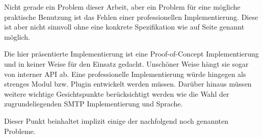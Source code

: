 Nicht gerade ein Problem dieser Arbeit, aber ein Problem für eine mögliche praktische Benutzung ist das Fehlen einer professionellen Implementierung. Diese ist aber nicht sinnvoll ohne eine konkrete Spezifikation wie auf Seite \pageref{section:spezifikation} genannt möglich.

Die hier präsentierte Implementierung ist eine Proof-of-Concept Implementierung und in keiner Weise für den Einsatz gedacht. Unschöner Weise hängt sie sogar von interner API ab.
Eine professionelle Implementierung würde hingegen als strenges Modul bzw. Plugin entwickelt werden müssen. Darüber hinaus müssen weitere wichtige Gesichtspunkte berücksichtigt werden wie die Wahl der zugrundeliegenden SMTP Implementierung und Sprache.

Dieser Punkt beinhaltet implizit einige der nachfolgend noch genannten Probleme.
